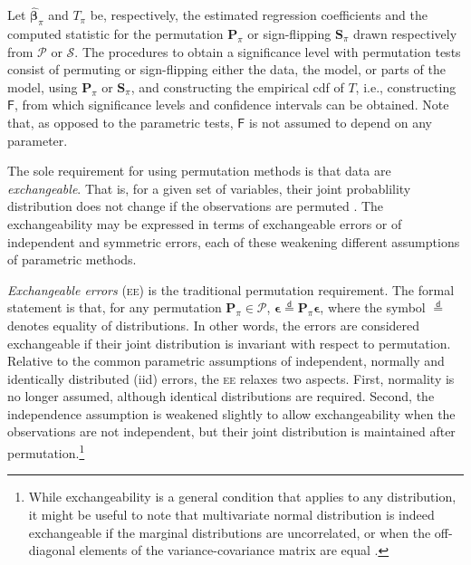 Let $\boldsymbol{\hat{\beta}}_{\pi}$ and $T_{\pi}$ be, respectively, the estimated regression coefficients and the computed statistic for the permutation $\mathbf{P}_{\pi}$ or sign-flipping $\mathbf{S}_{\pi}$ drawn respectively from $\mathcal{P}$ or $\mathcal{S}$. The procedures to obtain a significance level with permutation tests consist of permuting or sign-flipping either the data, the model, or parts of the model, using $\mathbf{P}_{\pi}$ or $\mathbf{S}_{\pi}$, and constructing the empirical cdf of $T$, i.e., constructing $\mathsf{F}$, from which significance levels and confidence intervals can be obtained. Note that, as opposed to the parametric tests, $\mathsf{F}$ is not assumed to depend on any parameter.

The sole requirement for using permutation methods is that data are \emph{exchangeable}. That is, for a given set of variables, their joint probablility distribution does not change if the observations are permuted \citep{Good2002}. The exchangeability may be expressed in terms of exchangeable errors or of independent and symmetric errors, each of these weakening different assumptions of parametric methods.

\emph{Exchangeable errors} (\textsc{ee}) is the traditional permutation requirement. The formal statement is that, for any permutation $\mathbf{P}_{\pi} \in \mathcal{P}$, $\boldsymbol{\epsilon} \stackrel{\mathsf{d}}{=} \mathbf{P}_{\pi}\boldsymbol{\epsilon}$, where the symbol $\stackrel{\mathsf{d}}{=}$ denotes equality of distributions. In other words, the errors are considered exchangeable if their joint distribution is invariant with respect to permutation. Relative to the common parametric assumptions of independent, normally and identically distributed (iid) errors, the \textsc{ee} relaxes two aspects. First, normality is no longer assumed, although identical distributions are required. Second, the independence assumption is weakened slightly to allow exchangeability when the observations are not independent, but their joint distribution is maintained after permutation.\footnote{While exchangeability is a general condition that applies to any distribution, it might be useful to note that multivariate normal distribution is indeed exchangeable if the marginal distributions are uncorrelated, or when the off-diagonal elements of the variance-covariance matrix are equal \citep{Commenges2003}.}

